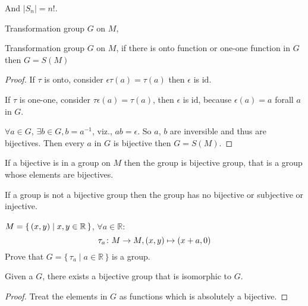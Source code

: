 \documentclass[../main.tex]{subfiles}
\begin{document}
And \(|S _{n}|  = n !\).  

Transformation group \(G\) on \(M\), 

\begin{thm}
	Transformation group \(G\) on \(M\), if there is onto function or one-one function in \(G\) then \(G = S(M)\)
\end{thm}

\begin{proof}
	If \(\tau \) is onto, consider \( \epsilon \tau(a) =  \tau (a)\) then \(\epsilon\) is \( \text{id}\). 

	If \( \tau\) is one-one, consider \(\tau\epsilon (a) =\tau (a)\), then \(\epsilon\) is \( \text{id}\), because \(\epsilon (a) = a\) forall \(a\) in \(G\). 

	\(\forall a \in G\), \( \exists b \in G , b = a ^{-1}\), viz., \( a b =\epsilon\). So \(a\), \(b\) are inversible and thus are
	bijectives. Then every \(a\) in \(G\) is bijective then 
	\(G  = S (M)\). 
\end{proof} 

If a bijective is in a group on \(M\) then the group is 
bijective group, that is a group whose elements are 
bijectives. 

If a group is not a bijective group then the group 
has no bijective or subjective or injective. 

\begin{exam}
	\(M = \{ \, (x,y) \mid x, y \in \mathbb{R} \, \}\), \(\forall a \in \mathbb{R}\):  
	\[
		\tau_{a} \colon M \to M , (x,y) \mapsto (x + a, 0)
	\]
	Prove that \(G = \{ \,\tau _{a} \mid a \in \mathbb{R} \, \}\) is a group. 
\end{exam}

\begin{thm}[Cayley]
\label{Cayley}
Given a \(G\), there exists a bijective group that is isomorphic to \(G\). 
\end{thm}
\begin{proof}
Treat the elements in \(G\) as functions which is absolutely a  
bijective.
\end{proof}
\end{document}
